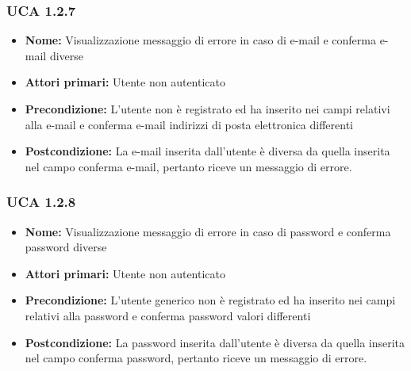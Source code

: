 \subsubsection{UCA 1.2.7}%
\begin{itemize}
\item \textbf{Nome:} Visualizzazione messaggio di errore in caso di e-mail e conferma e-mail diverse
\item \textbf{Attori primari:} Utente non autenticato
\item \textbf{Precondizione:} L’utente non è registrato ed ha inserito nei campi relativi alla e-mail e conferma e-mail indirizzi di posta elettronica differenti 
\item \textbf{Postcondizione:} La e-mail inserita dall'utente è diversa da quella inserita nel campo conferma e-mail, pertanto riceve un messaggio di errore.
\end{itemize}

\subsubsection{UCA 1.2.8}%
\begin{itemize}
\item \textbf{Nome:}  Visualizzazione messaggio di errore in caso di password e conferma password diverse
\item \textbf{Attori primari:} Utente non autenticato
\item \textbf{Precondizione:} L’utente generico non è registrato ed ha inserito nei campi relativi alla password e conferma password valori differenti
\item \textbf{Postcondizione:} La password inserita dall’utente è diversa da quella inserita nel campo conferma password, pertanto riceve un messaggio di errore.
\end{itemize}

